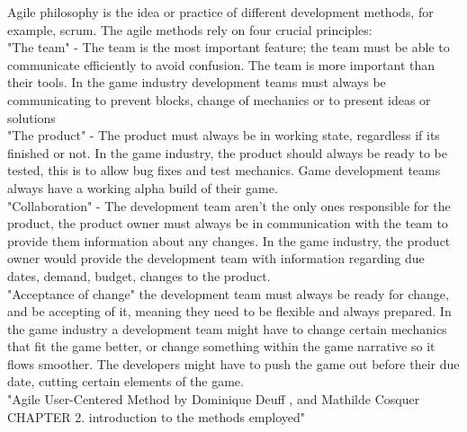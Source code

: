 \documentclass{scrartcl}
\begin{document}
Agile philosophy is the idea or practice of different development methods, for example, scrum. The agile methods rely on four crucial principles:\\  
"The team" - The team is the most important feature; the team must be able to communicate efficiently to avoid confusion. The team is more important than their tools. 
In the game industry development teams must always be communicating to prevent blocks, change of mechanics or to present ideas or solutions\\ 
"The product" -  The product must always be in working state, regardless if its finished or not. In the game industry, the product should always be ready to be tested, this is to allow bug fixes and test mechanics. Game development teams always have a working alpha build of their game.\\
"Collaboration" -  The development team aren't the only ones responsible for the product, the product owner must always be in communication with the team to provide them information about any changes. In the game industry, the product owner would provide the development team with information regarding due dates, demand, budget, changes to the product.\\ 
"Acceptance of change" the development team must always be ready for change, and be accepting of it, meaning they need to be flexible and always prepared. In the game industry a development team might have to change certain mechanics that fit the game better, or change something within the game narrative so it flows smoother. The developers might have to push the game out before their due date, cutting certain elements of the game.\\     
"Agile User-Centered Method by Dominique Deuff , and Mathilde Cosquer CHAPTER 2. introduction to the methods employed" 
\end{document}

